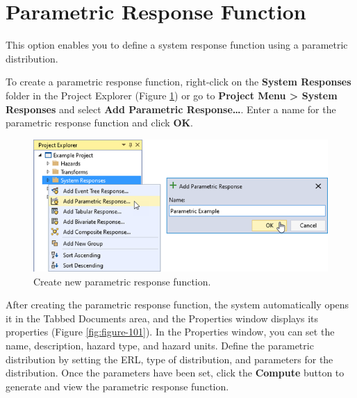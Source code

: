 \documentclass[
]{book}
\begin{document}
\hypertarget{parametric-response-function}{%
\section{Parametric Response Function}\label{parametric-response-function}}

This option enables you to define a system response function using a parametric distribution.

To create a parametric response function, right-click on the \textbf{System Responses} folder in the Project Explorer (Figure \ref{fig:figure-100}) or go to \textbf{Project Menu \textgreater{} System Responses} and select \textbf{Add Parametric Response\ldots{}}. Enter a name for the parametric response function and click \textbf{OK}.

\begin{figure}

{\centering \includegraphics{images/figure100} 

}

\caption{Create new parametric response function.}\label{fig:figure-100}
\end{figure}

After creating the parametric response function, the system automatically opens it in the Tabbed Documents area, and the Properties window displays its properties (Figure \ref{fig:figure-101}). In the Properties window, you can set the name, description, hazard type, and hazard units. Define the parametric distribution by setting the ERL, type of distribution, and parameters for the distribution. Once the parameters have been set, click the \textbf{Compute} button to generate and view the parametric response function.
\end{document}
